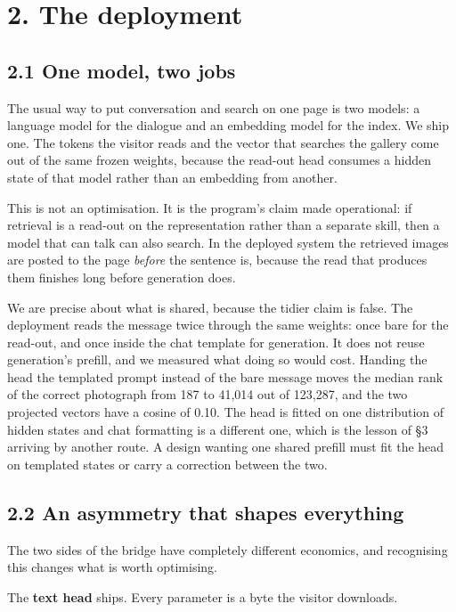 \documentclass[
  11pt,
]{article}
\begin{document}
\section{2. The deployment}\label{the-deployment}

\subsection{2.1 One model, two jobs}\label{one-model-two-jobs}

The usual way to put conversation and search on one page is two models:
a language model for the dialogue and an embedding model for the index.
We ship one. The tokens the visitor reads and the vector that searches
the gallery come out of the same frozen weights, because the read-out
head consumes a hidden state of that model rather than an embedding from
another.

This is not an optimisation. It is the program's claim made operational:
if retrieval is a read-out on the representation rather than a separate
skill, then a model that can talk can also search. In the deployed
system the retrieved images are posted to the page \emph{before} the
sentence is, because the read that produces them finishes long before
generation does.

We are precise about what is shared, because the tidier claim is false.
The deployment reads the message twice through the same weights: once
bare for the read-out, and once inside the chat template for generation.
It does not reuse generation's prefill, and we measured what doing so
would cost. Handing the head the templated prompt instead of the bare
message moves the median rank of the correct photograph from 187 to
41,014 out of 123,287, and the two projected vectors have a cosine of
0.10. The head is fitted on one distribution of hidden states and chat
formatting is a different one, which is the lesson of §3 arriving by
another route. A design wanting one shared prefill must fit the head on
templated states or carry a correction between the two.

\subsection{2.2 An asymmetry that shapes
everything}\label{an-asymmetry-that-shapes-everything}

The two sides of the bridge have completely different economics, and
recognising this changes what is worth optimising.

The \textbf{text head} ships. Every parameter is a byte the visitor
downloads.
\end{document}
